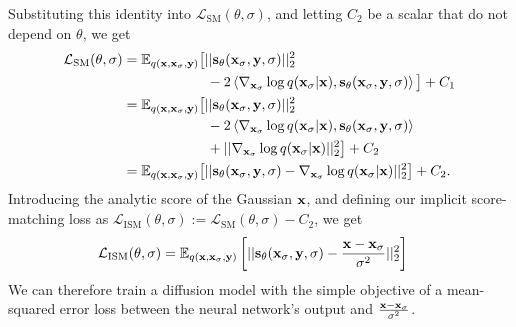 Substituting this identity into $\mathcal{L}_\text{SM}(\theta, \sigma)$, and letting $C_2$ be a scalar that do not depend on $\theta$, we get
\begin{align}
    \mathcal{L}_\text{SM}(\theta, \sigma) &= \mathbb{E}_{q({\mathbf{x}}, {\mathbf{x}}_\sigma, {\mathbf{y}})} \big[ 
    || {\mathbf{s}}_\theta({\mathbf{x}}_\sigma, {\mathbf{y}}, \sigma) ||_2^2
    \nonumber\\ &\qquad\qquad\qquad
    - 2 \left\langle \nabla_{{\mathbf{x}}_\sigma} \log q({\mathbf{x}}_\sigma|{\mathbf{x}}), {\mathbf{s}}_\theta({\mathbf{x}}_\sigma, {\mathbf{y}}, \sigma) \right\rangle \big] + C_1 \\
    &= \mathbb{E}_{q({\mathbf{x}}, {\mathbf{x}}_\sigma, {\mathbf{y}})} \big[ 
    || {\mathbf{s}}_\theta({\mathbf{x}}_\sigma, {\mathbf{y}}, \sigma) ||_2^2
    \nonumber\\ &\qquad\qquad\qquad
    - 2 \left\langle \nabla_{{\mathbf{x}}_\sigma} \log q({\mathbf{x}}_\sigma|{\mathbf{x}}), {\mathbf{s}}_\theta({\mathbf{x}}_\sigma, {\mathbf{y}}, \sigma) \right\rangle
    \nonumber\\ &\qquad\qquad\qquad
    + || \nabla_{{\mathbf{x}}_\sigma} \log q({\mathbf{x}}_\sigma|{\mathbf{x}}) ||_2^2 \big] + C_2 \\
    &= \mathbb{E}_{q({\mathbf{x}}, {\mathbf{x}}_\sigma, {\mathbf{y}})} \big[ 
    || {\mathbf{s}}_\theta({\mathbf{x}}_\sigma, {\mathbf{y}}, \sigma) - \nabla_{{\mathbf{x}}_\sigma} \log q({\mathbf{x}}_\sigma|{\mathbf{x}}) ||_2^2 \big] + C_2.
\end{align}
Introducing the analytic score of the Gaussian ${\mathbf{x}}$, and defining our implicit score-matching loss as $\mathcal{L}_\text{ISM}(\theta, \sigma) := \mathcal{L}_\text{SM}(\theta, \sigma) - C_2$, we get
\begin{align} \label{eq:ism-loss}
    \mathcal{L}_\text{ISM}(\theta, \sigma) &= \mathbb{E}_{q({\mathbf{x}}, {\mathbf{x}}_\sigma, {\mathbf{y}})} \left[ 
    || {\mathbf{s}}_\theta({\mathbf{x}}_\sigma, {\mathbf{y}}, \sigma) - \frac{{\mathbf{x}}-{\mathbf{x}}_\sigma}{\sigma^2} ||_2^2 \right]
\end{align}
We can therefore train a diffusion model with the simple objective of a mean-squared error loss between the neural network's output and $\frac{{\mathbf{x}}-{\mathbf{x}}_\sigma}{\sigma^2}$.

